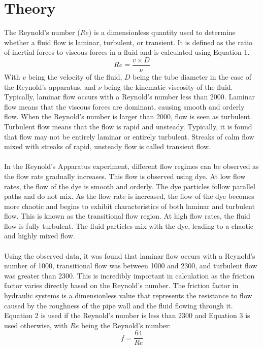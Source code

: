 \documentclass{article}
\begin{document}
\section{Theory}
\noindent The Reynold's number ($Re$) is a dimensionless quantity used to determine whether a fluid flow is laminar, turbulent, or transient. It is defined as the ratio of inertial forces to viscous forces in a fluid and is calculated using Equation 1. 
\begin{equation}
    Re=\frac{v\times D}{\nu}
\end{equation}
With $v$ being the velocity of the fluid, $D$ being the tube diameter in the case of the Reynold's apparatus, and $\nu$ being the kinematic viscosity of the fluid. Typically, laminar flow occurs with a Reynold's number less than 2000. Laminar flow means that the viscous forces are dominant, causing smooth and orderly flow. When the Reynold's number is larger than 2000, flow is seen as turbulent. Turbulent flow means that the flow is rapid and unsteady. Typically, it is found that flow may not be entirely laminar or entirely turbulent. Streaks of calm flow mixed with streaks of rapid, unsteady flow is called transient flow. \\\\
In the Reynold's Apparatus experiment, different flow regimes can be observed as the flow rate gradually increases. This flow is observed using dye. At low flow rates, the flow of the dye is smooth and orderly. The dye particles follow parallel paths and do not mix. As the flow rate is increased, the flow of the dye becomes more chaotic and begins to exhibit characteristics of both laminar and turbulent flow. This is known as the transitional flow region. At high flow rates, the fluid flow is fully turbulent. The fluid particles mix with the dye, leading to a chaotic and highly mixed flow. \\\\
Using the observed data, it was found that laminar flow occurs with a Reynold's number of 1000, transitional flow was between 1000 and 2300, and turbulent flow was greater than 2300. This is incredibly important in calculation as the friction factor varies directly based on the Reynold's number. The friction factor in hydraulic systems is a dimensionless value that represents the resistance to flow caused by the roughness of the pipe wall and the fluid flowing through it. Equation 2 is used if the Reynold's number is less than 2300 and Equation 3 is used otherwise, with $Re$ being the Reynold's number: 
\begin{equation} 
    f=\frac{64}{Re}
\end{equation}
\end{document}
